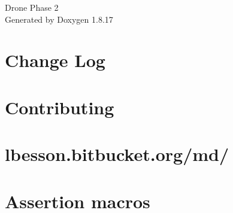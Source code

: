 \let\mypdfximage\pdfximage\def\pdfximage{\immediate\mypdfximage}\documentclass[twoside]{book}
\newcommand{\+}{\discretionary{\mbox{\scriptsize$\hookleftarrow$}}{}{}}
\newcommand{\clearemptydoublepage}{%
  \newpage{\pagestyle{empty}\cleardoublepage}%
}
\begin{document}
\hypersetup{pageanchor=false,
             bookmarksnumbered=true,
             pdfencoding=unicode
            }
\begin{titlepage}
\vspace*{7cm}
\begin{center}%
{\Large Drone Phase 2 }\\
\vspace*{1cm}
{\large Generated by Doxygen 1.8.17}\\
\end{center}
\end{titlepage}
\clearemptydoublepage
{}
\tableofcontents
\clearemptydoublepage
{}
\hypersetup{pageanchor=true}

\chapter{Change Log}
\label{md__home_kalafiorek__programowanie_obj2021_zad5_2-_mateusz-_paszkiewicz_external_doctest__c_h_a_n_g_e_l_o_g}

\chapter{Contributing}
\label{md__home_kalafiorek__programowanie_obj2021_zad5_2-_mateusz-_paszkiewicz_external_doctest__c_o_n_t_r_i_b_u_t_i_n_g}

\chapter{lbesson.\+bitbucket.\+org/md/}
\label{md__home_kalafiorek__programowanie_obj2021_zad5_2-_mateusz-_paszkiewicz_external_doctest_doc_htm736ee4d8be1fd64bbaa43f336f30629c}

\chapter{Assertion macros}
\label{md__home_kalafiorek__programowanie_obj2021_zad5_2-_mateusz-_paszkiewicz_external_doctest_doc_markdown_assertions}

\end{document}

